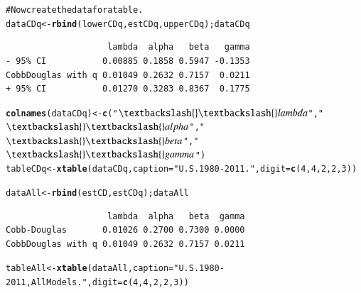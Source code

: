 \documentclass[preprint,authoryear,12pt]{elsarticle}\usepackage{graphicx, color}
\makeatletter
\newcommand{\hlfunctioncall}[1]{\textcolor[rgb]{0.501960784313725,0,0.329411764705882}{\textbf{#1}}}%
\newcommand{\hlstring}[1]{\textcolor[rgb]{0.6,0.6,1}{#1}}%
\newcommand{\hlcomment}[1]{\textcolor[rgb]{0.180392156862745,0.6,0.341176470588235}{#1}}%
\newenvironment{kframe}{%
 \def\at@end@of@kframe{}%
 \ifinner\ifhmode%
  \def\at@end@of@kframe{\end{minipage}}%
  \begin{minipage}{\columnwidth}%
 \fi\fi%
 \def\FrameCommand##1{\hskip\@totalleftmargin \hskip-\fboxsep
 \colorbox{shadecolor}{##1}\hskip-\fboxsep
     \hskip-\linewidth \hskip-\@totalleftmargin \hskip\columnwidth}%
 \MakeFramed {\advance\hsize-\width
   \@totalleftmargin\z@ \linewidth\hsize
   \@setminipage}}%
 {\par\unskip\endMakeFramed%
 \at@end@of@kframe}
\newenvironment{knitrout}{}{} %
\makeatother
\begin{document}
\begin{knitrout}
\begin{kframe}
\begin{alltt}
\hlcomment{# Now create the data for a table.}
dataCDq <- \hlfunctioncall{rbind}(lowerCDq, estCDq, upperCDq); dataCDq
\end{alltt}
\begin{verbatim}
                    lambda  alpha   beta   gamma
- 95% CI           0.00885 0.1858 0.5947 -0.1353
CobbDouglas with q 0.01049 0.2632 0.7157  0.0211
+ 95% CI           0.01270 0.3283 0.8367  0.1775
\end{verbatim}
\begin{alltt}
\hlfunctioncall{colnames}(dataCDq)  <- \hlfunctioncall{c}(\hlstring{"$\textbackslash{}\textbackslash{}lambda$"}, \hlstring{"$\textbackslash{}\textbackslash{}alpha$"}, \hlstring{"$\textbackslash{}\textbackslash{}beta$"}, \hlstring{"$\textbackslash{}\textbackslash{}gamma$"})
tableCDq <- \hlfunctioncall{xtable}(dataCDq, caption=\hlstring{"U.S. 1980-2011."}, digit = \hlfunctioncall{c}(4, 4, 2, 2, 3))

dataAll <- \hlfunctioncall{rbind}(estCD, estCDq); dataAll
\end{alltt}
\begin{verbatim}
                    lambda  alpha   beta  gamma
Cobb-Douglas       0.01026 0.2700 0.7300 0.0000
CobbDouglas with q 0.01049 0.2632 0.7157 0.0211
\end{verbatim}
\begin{alltt}
tableAll <- \hlfunctioncall{xtable}(dataAll, caption=\hlstring{"U.S. 1980-2011, All Models."}, digit = \hlfunctioncall{c}(4, 4, 2, 2, 3))
\end{alltt}
\end{kframe}
\end{knitrout}
\end{document}
